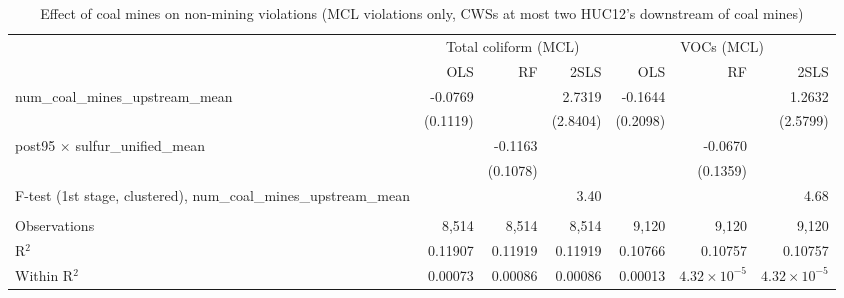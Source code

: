 
\begin{table}[htbp]
   
   \caption{\label{2sls_dwnstrm2step_nonminevio_mcl} Effect of coal mines on non-mining violations (MCL violations only, CWSs at most two HUC12's downstream of coal mines)}
   \bigskip
   
   \centering
   
   \begin{adjustbox}{width = \textwidth, center}
      
      
      \begin{tabular}{lrrrrrr}
         \toprule
         
          & \multicolumn{3}{c}{Total coliform (MCL)} & \multicolumn{3}{c}{VOCs (MCL)}\\
         
                                                                             & OLS      & RF       & 2SLS     & OLS      & RF                    & 2SLS\\  
         
         \midrule 
         num\_coal\_mines\_upstream\_mean                                    & -0.0769  &          & 2.7319   & -0.1644  &                       & 1.2632\\   
                                                                             & (0.1119) &          & (2.8404) & (0.2098) &                       & (2.5799)\\   
         post95 $\times$ sulfur\_unified\_mean                               &          & -0.1163  &          &          & -0.0670               &   \\   
                                                                             &          & (0.1078) &          &          & (0.1359)              &   \\   
         
         F-test (1st stage, clustered), num\_coal\_mines\_upstream\_mean     &          &          & 3.40     &          &                       & 4.68\\  
         
          \\
         
         Observations                                                        & 8,514    & 8,514    & 8,514    & 9,120    & 9,120                 & 9,120\\  
         R$^2$                                                               & 0.11907  & 0.11919  & 0.11919  & 0.10766  & 0.10757               & 0.10757\\  
         Within R$^2$                                                        & 0.00073  & 0.00086  & 0.00086  & 0.00013  & $4.32\times 10^{-5}$  & $4.32\times 10^{-5}$\\   
         

\end{tabular}
\end{adjustbox}
\end{table}

